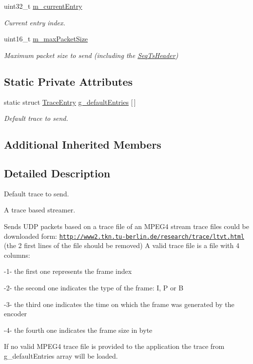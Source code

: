 \begin{DoxyCompactItemize}
uint32\+\_\+t \hyperlink{structns3_1_1UdpTraceClient_a2b4e8272143ce09fb70f32ae44bb3a55}{m\+\_\+current\+Entry}
\begin{DoxyCompactList}\small\item\em Current entry index. \end{DoxyCompactList}\item 
uint16\+\_\+t \hyperlink{structns3_1_1UdpTraceClient_aa5ba9f3cd73ca417df59d14bb18e16a1}{m\+\_\+max\+Packet\+Size}
\begin{DoxyCompactList}\small\item\em Maximum packet size to send (including the \hyperlink{classns3_1_1SeqTsHeader}{Seq\+Ts\+Header}) \end{DoxyCompactList}\end{DoxyCompactItemize}
\subsection*{Static Private Attributes}
\begin{DoxyCompactItemize}
\item 
static struct \hyperlink{structns3_1_1UdpTraceClient_1_1TraceEntry}{Trace\+Entry} \hyperlink{structns3_1_1UdpTraceClient_ac64efa8d08c449e13e6b74c83111674f}{g\+\_\+default\+Entries} \mbox{[}$\,$\mbox{]}
\begin{DoxyCompactList}\small\item\em Default trace to send. \end{DoxyCompactList}\end{DoxyCompactItemize}
\subsection*{Additional Inherited Members}


\subsection{Detailed Description}
Default trace to send. 

A trace based streamer.

Sends U\+DP packets based on a trace file of an M\+P\+E\+G4 stream trace files could be downloaded form\+: \href{http://www2.tkn.tu-berlin.de/research/trace/ltvt.html}{\tt http\+://www2.\+tkn.\+tu-\/berlin.\+de/research/trace/ltvt.\+html} (the 2 first lines of the file should be removed) A valid trace file is a file with 4 columns\+: \begin{DoxyItemize}
\item -\/1-\/ the first one represents the frame index \item -\/2-\/ the second one indicates the type of the frame\+: I, P or B \item -\/3-\/ the third one indicates the time on which the frame was generated by the encoder \item -\/4-\/ the fourth one indicates the frame size in byte\end{DoxyItemize}
If no valid M\+P\+E\+G4 trace file is provided to the application the trace from g\+\_\+default\+Entries array will be loaded. 

